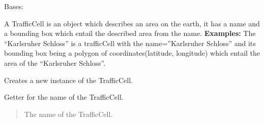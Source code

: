 \documentclass[letterpaper,10pt,english]{sphinxmanual}
\begin{document}
\begin{fulllineitems}
\label{\detokenize{apidoc/src.osm_configurator.model.project.calculation:src.osm_configurator.model.project.calculation.traffic_cell.TrafficCell}}
\pysigstartsignatures
{}
\pysigstopsignatures
\sphinxAtStartPar
Bases: 

\sphinxAtStartPar
A TrafficCell is an object which describes an area on the earth, it has a name and a bounding box which
entail the described area from the name.
\newline
\textbf{Examples:}
\sphinxAtStartPar
The “Karlsruher Schloss” is a trafficCell with the name=”Karlsruher Schloss” and its bounding box being
a polygon of coordinates(latitude, longitude) which entail the area of the “Karlsruher Schloss”.

\begin{fulllineitems}
\label{\detokenize{apidoc/src.osm_configurator.model.project.calculation:src.osm_configurator.model.project.calculation.traffic_cell.TrafficCell.__init__}}
\pysigstartsignatures
{}
\pysigstopsignatures
\sphinxAtStartPar
Creates a new instance of the TrafficCell.

\end{fulllineitems}


\begin{fulllineitems}
\label{\detokenize{apidoc/src.osm_configurator.model.project.calculation:src.osm_configurator.model.project.calculation.traffic_cell.TrafficCell.get_name}}
\pysigstartsignatures
{}
\pysigstopsignatures
\sphinxAtStartPar
Getter for the name of the TrafficCell.
\begin{quote}\begin{description}
\sphinxAtStartPar
The name of the TrafficCell.

\sphinxAtStartPar
{}


\end{description}
\end{quote}
\end{fulllineitems}
\end{fulllineitems}
\end{document}
